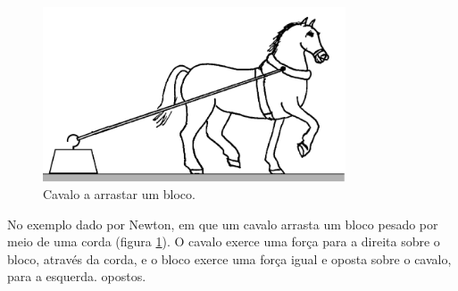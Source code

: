 \documentclass[a4paper,12pt]{article}
\begin{document}
\begin{figure}
\centering
\includegraphics[width=0.8\textwidth]{cavalo.pdf}
\caption{Cavalo a arrastar um bloco.}\label{fig:cavalo}
\end{figure}

No exemplo dado por Newton, em que um cavalo arrasta um bloco pesado
por meio de uma corda (figura \ref{fig:cavalo}). O cavalo exerce uma
força para a direita sobre o bloco, através da corda, e o bloco exerce
uma força igual e oposta sobre o cavalo, para a esquerda.  opostos.
\end{document}
